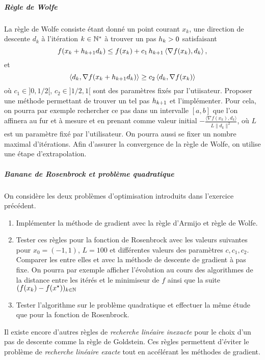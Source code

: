 \documentclass[a4paper,french,12pt]{article}
\begin{document}
\subparagraph{Règle de Wolfe} 
La règle de Wolfe consiste étant donné
un point courant $x_k$, une direction de descente $d_k$ à l'itération
$k \in \mathbb{N}^*$ à trouver un pas $h_k >0$ satisfaisant
\begin{equation*}
  f(x_{k} + h_{k+1} d_{k}) \leq f(x_{k}) 
+ c_1\, h_{k+1}\, \langle \nabla f(x_{k}),d_{k} \rangle \, , 
\end{equation*}
et 
\begin{equation*}
  \left\langle d_k,\nabla f(x_k+h_{k+1} d_k) \right\rangle \geq  c_2    \left\langle d_k,\nabla f(x_k) \right\rangle
\end{equation*}
où $c_1 \in ]0,1/2[$, $c_2 \in ]1/2,1[$ sont des paramètres fixés par
l'utiisateur.  Proposer une méthode permettant de trouver un tel pas
$h_{k+1}$ et l'implémenter. Pour cela, on pourra par exemple
rechercher ce pas dans un intervalle
$[a,b]$ que l'on affinera au fur et à mesure et en prenant comme valeur initial $-\frac{\langle \nabla f(x_{k}),d_{k} \rangle}{L \|d_{k}\|^2}$, où
$L$ est un paramètre fixé par l'utilisateur. On pourra aussi se fixer un nombre maximal d'itérations. Afin d'assurer la convergence de la règle de Wolfe, on utilise une étape d'extrapolation.


\subparagraph{Banane de Rosenbrock et problème quadratique}On considère les deux problèmes d'optimisation introduits dans l'exercice précédent.

\begin{enumerate}
\item Implémenter la méthode de gradient avec la règle d'Armijo et règle de Wolfe.
  
\item Tester ces règles pour la fonction de Rosenbrock avec les valeurs suivantes pour $x_{0} = (-1,1)$, $L=100$ et différentes valeurs des paramètres $c,c_1,c_2$. Comparer les entre elles et avec la méthode de descente de gradient à pas fixe. On pourra par exemple afficher l'évolution au cours des algorithmes de la distance entre les itérés et le minimiseur de $f$ ainsi que la suite $(f(x_k)-f(x^{\star}))_{k \in \mathbb{N}}$
  
\item  Tester l'algorithme sur le problème quadratique et effectuer la même étude que pour la fonction de Rosenbrock.
\end{enumerate}

\begin{remarque}
Il existe encore d'autres règles de \textit{recherche linéaire inexacte} pour le choix d'un pas de descente comme la règle de Goldstein. Ces règles permettent d'éviter le problème de \textit{recherche linéaire exacte} tout en accélérant les méthodes de gradient.
\end{remarque}
%
\end{document}
